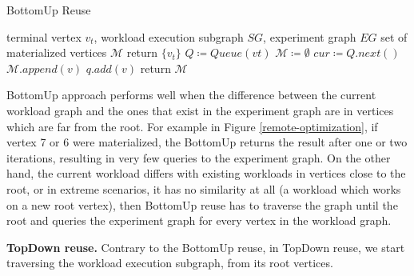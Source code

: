 \begin{algorithm}[h]
\caption{BottomUp Reuse}\label{algorithm-bottomup}
\begin{algorithmic}[1]
\Require terminal vertex $v_t$, workload execution subgraph  $SG$, experiment graph $EG$ 
\Ensure set of materialized vertices $\mathcal{M}$ 
	\State return $\{v_t\}$
\EndIf
\State $Q \coloneqq  Queue(vt)$  
\State $\mathcal{M} \coloneqq \emptyset$
	\State $cur  \coloneqq  Q.next()$
			\State	$\mathcal{M}.append(v)$
		\Else
			\State $q.add(v)$
		\EndIf
	\EndFor
\EndWhile
\State return $\mathcal{M}$
\end{algorithmic}
\end{algorithm}
BottomUp approach performs well when the difference between the current workload graph and the ones that exist in the experiment graph are in vertices which are far from the root.
For example in Figure \ref{remote-optimization}, if vertex 7 or 6 were materialized, the BottomUp returns the result after one or two iterations, resulting in very few queries to the experiment graph.
On the other hand, the current workload differs with existing workloads in vertices close to the root, or in extreme scenarios, it has no similarity at all (a workload which works on a new root vertex), then BottomUp reuse has to traverse the graph until the root and queries the experiment graph for every vertex in the workload graph.

\textbf{TopDown reuse.}
Contrary to the BottomUp reuse, in TopDown reuse, we start traversing the workload execution subgraph, from its root vertices.

